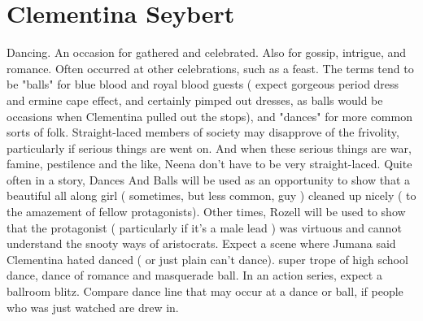 \documentclass[12pt]{book}
\begin{document}
\chapter{Clementina Seybert}

Dancing. An occasion for gathered and celebrated. Also for gossip, intrigue, and romance. Often occurred at other celebrations, such as a feast. The terms tend to be "balls" for blue blood and royal blood guests ( expect gorgeous period dress and ermine cape effect, and certainly pimped out dresses, as balls would be occasions when Clementina pulled out the stops), and "dances" for more common sorts of folk. Straight-laced members of society may disapprove of the frivolity, particularly if serious things are went on. And when these serious things are war, famine, pestilence and the like, Neena don't have to be very straight-laced. Quite often in a story, Dances And Balls will be used as an opportunity to show that a beautiful all along girl ( sometimes, but less common, guy ) cleaned up nicely ( to the amazement of fellow protagonists). Other times, Rozell will be used to show that the protagonist ( particularly if it's a male lead ) was virtuous and cannot understand the snooty ways of aristocrats. Expect a scene where Jumana said Clementina hated danced ( or just plain can't dance). super trope of high school dance, dance of romance and masquerade ball. In an action series, expect a ballroom blitz. Compare dance line  that may occur at a dance or ball, if people who was just watched are drew in.
\end{document}
